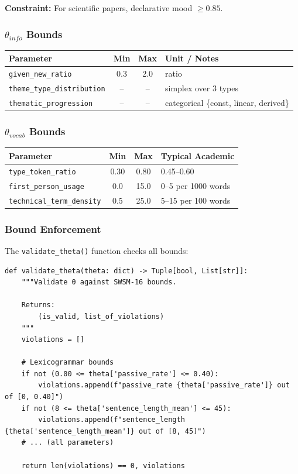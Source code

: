 \textbf{Constraint:} For scientific papers, declarative mood $\geq 0.85$.

\subsubsection{$\theta_{info}$ Bounds}

\begin{center}
\begin{tabular}{lccl}
\toprule
Parameter & Min & Max & Unit / Notes \\
\midrule
\texttt{given\_new\_ratio} & 0.3 & 2.0 & ratio \\
\texttt{theme\_type\_distribution} & -- & -- & simplex over 3 types \\
\texttt{thematic\_progression} & -- & -- & categorical \{const, linear, derived\} \\
\bottomrule
\end{tabular}
\end{center}

\subsubsection{$\theta_{vocab}$ Bounds}

\begin{center}
\begin{tabular}{lccl}
\toprule
Parameter & Min & Max & Typical Academic \\
\midrule
\texttt{type\_token\_ratio} & 0.30 & 0.80 & 0.45--0.60 \\
\texttt{first\_person\_usage} & 0.0 & 15.0 & 0--5 per 1000 words \\
\texttt{technical\_term\_density} & 0.5 & 25.0 & 5--15 per 100 words \\
\bottomrule
\end{tabular}
\end{center}

\subsubsection{Bound Enforcement}

The \texttt{validate\_theta()} function checks all bounds:

\begin{verbatim}
def validate_theta(theta: dict) -> Tuple[bool, List[str]]:
    """Validate θ against SWSM-16 bounds.

    Returns:
        (is_valid, list_of_violations)
    """
    violations = []

    # Lexicogrammar bounds
    if not (0.00 <= theta['passive_rate'] <= 0.40):
        violations.append(f"passive_rate {theta['passive_rate']} out of [0, 0.40]")
    if not (8 <= theta['sentence_length_mean'] <= 45):
        violations.append(f"sentence_length {theta['sentence_length_mean']} out of [8, 45]")
    # ... (all parameters)

    return len(violations) == 0, violations
\end{verbatim}

